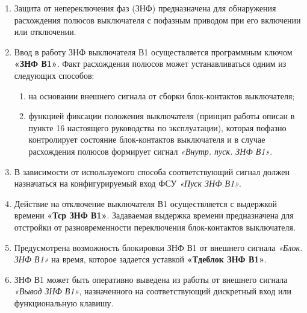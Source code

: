 
\color{black}

\begin{enumerate}[label=\arabic{section}.\arabic{subsection}.\arabic{enumi}, labelsep=4pt, leftmargin=0pt, itemindent=57pt, itemsep=0pt, parsep=0pt] %

\item
Защита от непереключения фаз (ЗНФ) предназначена для обнаружения расхождения полюсов выключателя с пофазным приводом при его включении или отключении. 

\item
Ввод в работу ЗНФ выключателя В1 осуществляется программным ключом \textbf{«ЗНФ В1»}. Факт расхождения полюсов может устанавливаться одним из следующих способов:

\begin{enumerate}[label=\arabic*)]
\item на основании внешнего сигнала от сборки блок-контактов выключателя;
\item функцией фиксации положения выключателя (принцип работы описан в пункте 16 настоящего руководства по эксплуатации), которая пофазно контролирует состояние блок-контактов выключателя и в случае расхождения полюсов формирует сигнал \textit{«Внутр. пуск. ЗНФ В1»}.
\end{enumerate}

\item
В зависимости от используемого способа соответствующий сигнал должен назначаться на конфигурируемый вход ФСУ \textit{«Пуск ЗНФ В1»}.

\item
Действие на отключение выключателя В1 осуществляется с выдержкой времени \textbf{«Тср ЗНФ В1»}. Задаваемая выдержка времени предназначена для отстройки от разновременности переключения блок-контактов выключателя.

\item
Предусмотрена возможность блокировки ЗНФ В1 от внешнего сигнала \textit{«Блок. ЗНФ В1»} на время, которое задается уставкой \textbf{«Тдеблок ЗНФ В1»}.

\item
ЗНФ В1 может быть оперативно выведена из работы от внешнего сигнала \textit{«Вывод ЗНФ В1»}, назначенного на соответствующий дискретный вход или функциональную клавишу.


\end{enumerate}
